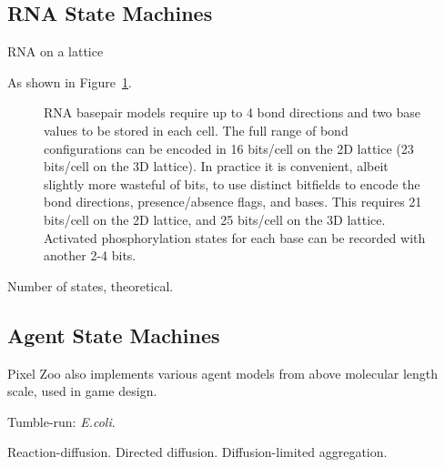 \documentclass{acm_proc_article-sp}
\begin{document}
\subsection{RNA State Machines}

RNA on a lattice \cite{LeoniVanderzande2003,JostEveraers2010,ZaraPretti2007,GillespieMayneJiang2009}


As shown in Figure~\ref{fig:rna}.

\begin{figure}
\caption{
\label{fig:rna}
RNA basepair models require up to 4 bond directions and two base values to be stored in each cell.
The full range of bond configurations can be encoded in 16 bits/cell on the 2D lattice (23 bits/cell on the 3D lattice).
In practice it is convenient, albeit slightly more wasteful of bits,
to use distinct bitfields to encode the bond directions, presence/absence flags, and bases.
This requires 21 bits/cell on the 2D lattice, and 25 bits/cell on the 3D lattice.
Activated phosphorylation states for each base can be recorded with another 2-4 bits.
}
\end{figure}

Number of states, theoretical.


\subsection{Agent State Machines}

Pixel Zoo also implements various agent models from above molecular length scale, used in game design.

Tumble-run: {\em E.coli}.
\cite{RosserEtAl2013}


Reaction-diffusion.
Directed diffusion.
Diffusion-limited aggregation.
\cite{DLA}
\end{document}
